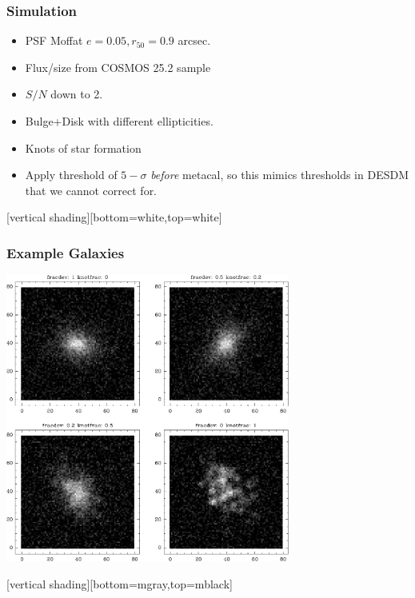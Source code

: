 \documentclass{beamer}
\begin{document}
\frame
{

    \frametitle{Simulation}

    \begin{itemize}
        \item PSF Moffat $e=0.05, r_{50} = 0.9$ arcsec.
        \item Flux/size from COSMOS 25.2 sample
        \item $S/N$ down to 2.
        \item Bulge+Disk with different ellipticities.
        \item Knots of star formation
        \item Apply threshold of $5-\sigma$ {\em before} metacal, so this
            mimics thresholds in DESDM that we cannot correct for.
    \end{itemize}


}

{

    [vertical shading][bottom=white,top=white]
    \frame
    {
        \frametitle{Example Galaxies}
     
        \begin{center}
            \includegraphics[width=0.7\textwidth]{mosaic-009086.pdf}
            \newline
        \end{center}

    }
    [vertical shading][bottom=mgray,top=mblack]

}
\end{document}

